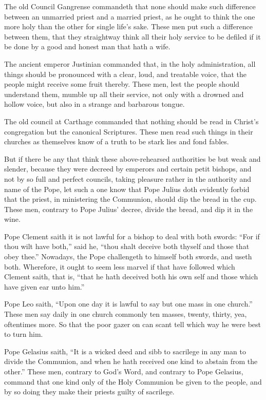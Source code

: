 The old Council Gangrense commandeth that none should make such difference
between an unmarried priest and a married priest, as he ought
to think the one more holy than the other for single life’s sake.
These men put such a difference between them, that they straightway
think all their holy service to be defiled if it be done by a good and
honest man that hath a wife.

The ancient emperor Justinian commanded that, in the holy administration,
all things should be pronounced with a clear, loud, and treatable voice,
that the people might receive some fruit thereby. These men, lest
the people should understand them, mumble up all their service, not
only with a drowned and hollow voice, but also in a strange and barbarous
tongue.

The old council at Carthage commanded that nothing should be read
in Christ’s congregation but the canonical Scriptures. These
men read such things in their churches as themselves know of a truth
to be stark lies and fond fables.

But if there be any that think these above-rehearsed authorities
be but weak and slender, because they were decreed by emperors and certain
petit bishops, and not by so full and perfect councils, taking pleasure
rather in the authority and name of the Pope, let such a one know that
Pope Julius doth evidently forbid that the priest, in ministering the
Communion, should dip the bread
in the cup. These men, contrary to Pope Julius’ decree,
divide the bread, and dip it in the wine.

Pope Clement saith it is not lawful for a bishop to deal with both
swords: “For if thou wilt have both,” said he, “thou
shalt deceive both thyself and those that obey thee.” Nowadays,
the Pope challengeth to himself both swords, and useth both. Wherefore,
it ought to seem less marvel if that have followed which Clement saith,
that is, “that he hath deceived both his own self and those which
have given ear unto him.”

Pope Leo saith, “Upon one day it is lawful to say but one mass
in one church.” These men say daily in one church commonly
ten masses, twenty, thirty, yea, oftentimes more. So that the
poor gazer on can scant tell which way he were best to turn him.

Pope Gelasius saith, “It is a wicked deed and sibb to sacrilege
in any man to divide the Communion, and when he hath received one kind
to abstain from the other.” These men, contrary to God’s
Word, and contrary to Pope Gelasius, command that one kind only of the
Holy Communion be given to the people, and by so doing they make their
priests guilty of sacrilege.

